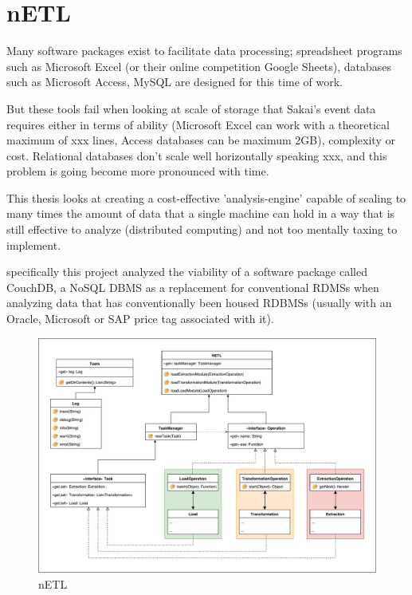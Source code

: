 



\section{nETL}
Many software packages exist to facilitate data processing; spreadsheet programs such as Microsoft Excel (or their online competition Google Sheets), databases such as Microsoft Access, MySQL are designed for this time of work.

But these tools fail when looking at scale of storage that Sakai's event data requires either in terms of ability (Microsoft Excel can work with a theoretical maximum of xxx lines, Access databases can be maximum 2GB), complexity or cost. Relational databases don't scale well horizontally speaking xxx, and this problem is going become more pronounced with time.

This thesis looks at creating a cost-effective 'analysis-engine' capable of scaling to many times the amount of data that a single machine can hold in a way that is still effective to analyze (distributed computing) and not too mentally taxing to implement.

specifically this project analyzed the viability of a software package called CouchDB, a NoSQL DBMS as a replacement for conventional RDMSs when analyzing data that has conventionally been housed RDBMSs (usually with an Oracle, Microsoft or SAP price tag associated with it).

\begin{figure}[h]
    \centering
    \includegraphics[scale=0.4]{../resources/figures/netlUML.pdf}
    \caption[nETL]{nETL}
    \label{nETL}
\end{figure}

